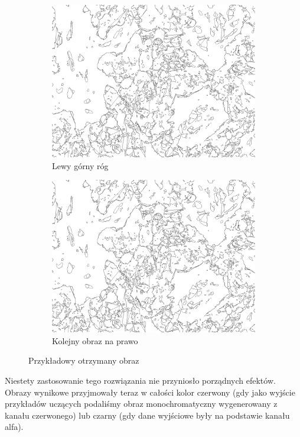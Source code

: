 \documentclass{article}
\begin{document}
\begin{figure}[H]
  \centering
  \begin{subfigure}{0.4\linewidth}
    \includegraphics[width=\linewidth]{images/output.jpg}
    \caption{Lewy górny róg}
  \end{subfigure}
  \begin{subfigure}{0.4\linewidth}
    \includegraphics[width=\linewidth]{images/output.jpg}
    \caption{Kolejny obraz na prawo}
  \end{subfigure}
  \caption{Przykładowy otrzymany obraz}
  \label{fig:input_split}
\end{figure}

Niestety zastosowanie tego rozwiązania nie przyniosło porządnych efektów.
Obrazy wynikowe przyjmowały teraz w całości kolor czerwony (gdy jako wyjście przykładów uczących podaliśmy obraz monochromatyczny wygenerowany z kanału czerwonego) lub
czarny (gdy dane wyjściowe były na podstawie kanału alfa).
\end{document}
